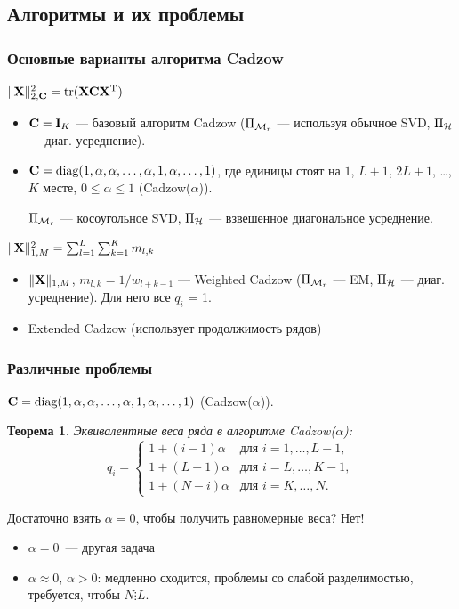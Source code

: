 \documentclass[unicode, notheorems]{beamer}
\newtheorem{theorem}{Теорема}
\begin{document}
\subsection{Алгоритмы и их проблемы}
\begin{frame}
	\frametitle{Основные варианты алгоритма Cadzow}
	$\|\mathbf{X}\|_{2, \mathbf{C}}^2 = \text{tr}(\mathbf{X} \mathbf{C} \mathbf{X}^{\mathrm{T}})$
	\begin{itemize}
		\item $\mathbf{C} = \mathbf{I}_K$ --- базовый алгоритм Cadzow ($\Pi_{\mathcal{M}_r}$ --- используя обычное SVD, $\Pi_{\mathcal{H}}$ --- диаг. усреднение).
		\item $\mathbf{C} = \text{diag}(1, \alpha, \alpha, \ldots, \alpha, 1, \alpha, \ldots, 1)$,
		где единицы стоят на $1$, $L + 1$, $2L + 1$, \ldots , $K$ месте, $0 \le \alpha \le 1$ (Cadzow($\alpha$)).
		
		$\Pi_{\mathcal{M}_r}$ --- косоугольное SVD, $\Pi_{\mathcal{H}}$ --- взвешенное диагональное усреднение.
	\end{itemize}
	
	\vspace{0.6cm}
	$\|\mathbf{X}\|^2_{1, M} =  \sum_{l = 1}^L \sum_{k = 1}^K m_{l, k}$
	\begin{itemize}
		\item $\|\mathbf{X}\|_{1, M}$, $m_{l, k} = 1 / w_{l + k - 1}$ --- Weighted Cadzow ($\Pi_{\mathcal{M}_r}$ --- EM, $\Pi_{\mathcal{H}}$ --- диаг. усреднение). Для него все $q_i$ = 1.
		\item Extended Cadzow (использует продолжимость рядов)
	\end{itemize}
	
	\vspace{0.3cm}
	
\end{frame}

\begin{frame}
	\frametitle{Различные проблемы}
	 $\mathbf{C} = \text{diag}(1, \alpha, \alpha, \ldots, \alpha, 1, \alpha, \ldots, 1)$ (Cadzow($\alpha$)).
	\begin{theorem}
		Эквивалентные веса ряда в алгоритме Cadzow($\alpha$):
		\begin{equation*}
		q_i = \begin{cases}
		1 + (i - 1) \alpha & \text{для $i = 1, \ldots, L-1,$}\\
		1 + (L - 1) \alpha & \text{для $i = L, \ldots, K-1,$}\\
		1 + (N - i) \alpha & \text{для $i = K, \ldots, N.$}
		\end{cases}
	    \end{equation*}
	\end{theorem}
	
	Достаточно взять $\alpha = 0$, чтобы получить равномерные веса? Нет! 
	\begin{itemize}
		\item  $\alpha = 0$~--- другая задача
		\item $\alpha \approx 0$, $\alpha > 0$: медленно сходится, проблемы со слабой разделимостью, требуется, чтобы $N \vdots L$.
	\end{itemize}

\end{frame}
\end{document}
